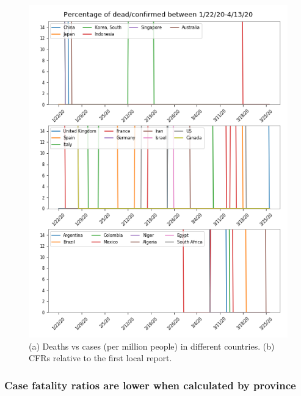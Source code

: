 \documentclass[8pt]{article}
\begin{document}
\begin{figure}[h]
\begin{minipage}{0.5\textwidth}
    \includegraphics[width=\textwidth]{figures/tsam_COVID19_JHU_cfr_fromFirstLocalCase.png}
    \end{minipage}
    \caption{(a) Deaths vs cases (per million people) in different countries. (b) CFRs relative to the first local report.}
    \label{fig:casesDeaths1000}
\end{figure}

\subsubsection{Case fatality ratios are lower when calculated by province}
\end{document}
